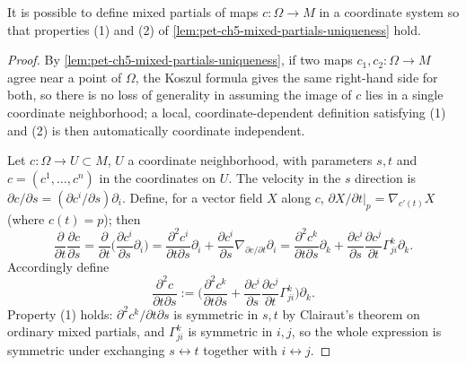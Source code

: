 \begin{theorem}
  \label{thm:pet-ch5-mixed-partials-existence}
  \leanok
  It is possible to define mixed partials of maps $c:\Omega\to M$ in a coordinate
  system so that properties (1) and (2) of \cref{lem:pet-ch5-mixed-partials-uniqueness}
  hold.
\end{theorem}
\begin{proof}
  \leanok
  By \cref{lem:pet-ch5-mixed-partials-uniqueness}, if two maps $c_1,c_2:\Omega\to M$
  agree near a point of $\Omega$, the Koszul formula gives the same right-hand
  side for both, so there is no loss of generality in assuming the image of $c$
  lies in a single coordinate neighborhood; a local, coordinate-dependent
  definition satisfying (1) and (2) is then automatically coordinate independent.

  Let $c:\Omega\to U\subset M$, $U$ a coordinate neighborhood, with parameters
  $s,t$ and $c=(c^1,\dots,c^n)$ in the coordinates on $U$. The velocity in the $s$
  direction is $\partial c/\partial s=(\partial c^i/\partial s)\partial_i$. Define, for a
  vector field $X$ along $c$, $\partial X/\partial t|_p=\nabla_{c'(t)}X$ (where
  $c(t)=p$); then
  \[
    \frac{\partial}{\partial t}\frac{\partial c}{\partial s}
    =\frac{\partial}{\partial t}\Big(\frac{\partial c^i}{\partial s}\partial_i\Big)
    =\frac{\partial^2c^i}{\partial t\partial s}\partial_i+\frac{\partial c^i}{\partial s}\nabla_{\partial c/\partial t}\partial_i
    =\frac{\partial^2c^k}{\partial t\partial s}\partial_k
    +\frac{\partial c^i}{\partial s}\frac{\partial c^j}{\partial t}\Gamma^k_{ji}\partial_k.
  \]
  Accordingly define
  \[
    \frac{\partial^2c}{\partial t\partial s}
    :=\Big(\frac{\partial^2c^k}{\partial t\partial s}+\frac{\partial c^i}{\partial s}\frac{\partial c^j}{\partial t}\Gamma^k_{ji}\Big)\partial_k.
  \]
  Property (1) holds: $\partial^2c^k/\partial t\partial s$ is symmetric in $s,t$ by
  Clairaut's theorem on ordinary mixed partials, and $\Gamma^k_{ji}$ is symmetric
  in $i,j$, so the whole expression is symmetric under exchanging $s\leftrightarrow t$
  together with $i\leftrightarrow j$.


\end{proof}
